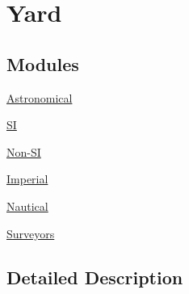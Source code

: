 \hypertarget{group___e_g_x_math-_conversions-_length_conversions-_imperial-_yard}{}\section{Yard}
\label{group___e_g_x_math-_conversions-_length_conversions-_imperial-_yard}
\subsection*{Modules}
\begin{DoxyCompactItemize}
\item 
\mbox{\hyperlink{group___e_g_x_math-_conversions-_length_conversions-_imperial-_yard-_astronomical}{Astronomical}}
\item 
\mbox{\hyperlink{group___e_g_x_math-_conversions-_length_conversions-_imperial-_yard-_s_i}{SI}}
\item 
\mbox{\hyperlink{group___e_g_x_math-_conversions-_length_conversions-_imperial-_yard-_non-_s_i}{Non-\/\+SI}}
\item 
\mbox{\hyperlink{group___e_g_x_math-_conversions-_length_conversions-_imperial-_yard-_imperial}{Imperial}}
\item 
\mbox{\hyperlink{group___e_g_x_math-_conversions-_length_conversions-_imperial-_yard-_nautical}{Nautical}}
\item 
\mbox{\hyperlink{group___e_g_x_math-_conversions-_length_conversions-_imperial-_yard-_surveyors}{Surveyors}}
\end{DoxyCompactItemize}


\subsection{Detailed Description}

